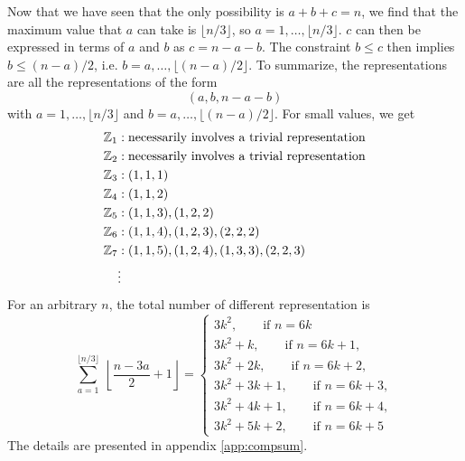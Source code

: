             Now that we have seen that the only possibility is $a+b+c=n$, we find that the maximum value that $a$ can take is $\lfloor n/3\rfloor$, so $a=1,\dots,\lfloor n/3\rfloor$. $c$ can then be expressed in terms of $a$ and $b$ as $c=n-a-b$. The constraint $b\leq c$ then implies $b\leq (n-a)/2$, i.e. $b=a,\dots,\lfloor (n-a)/2\rfloor$. To summarize, the representations are all the representations of the form
            \begin{equation}
                (a,b,n-a-b)
            \end{equation}
            with $a=1,\dots,\lfloor n/3\rfloor$ and $b=a,\dots,\lfloor (n-a)/2\rfloor$. For small values, we get
            \begin{align*}
                \mathbb{Z}_1 &: \text{necessarily involves a trivial representation}\\
                \mathbb{Z}_2 &: \text{necessarily involves a trivial representation}\\
                \mathbb{Z}_3 &: (1,1,1)\\
                \mathbb{Z}_4 &: (1,1,2)\\
                \mathbb{Z}_5 &: (1,1,3),(1,2,2)\label{reprZ5C3}\\
                \mathbb{Z}_6 &: (1,1,4),(1,2,3),(2,2,2)\\
                \mathbb{Z}_7 &: (1,1,5),(1,2,4),(1,3,3),(2,2,3)\\
                &\vdots
            \end{align*}
            For an arbitrary $n$, the total number of different representation is
            \begin{equation}
                \sum^{\lfloor n/3\rfloor}_{a=1}~\left\lfloor \frac{n-3a}{2}+1\right\rfloor = \begin{cases}
                    3k^2,\qquad\text{if $n=6k$}\\
                    3k^2+k,\qquad\text{if $n=6k+1$},\\
                    3k^2+2k,\qquad\text{if $n=6k+2$},\\
                    3k^2+3k+1,\qquad\text{if $n=6k+3$},\\
                    3k^2+4k+1,\qquad\text{if $n=6k+4$},\\
                    3k^2+5k+2,\qquad\text{if $n=6k+5$}
                \end{cases}
            \end{equation}
            The details are presented in appendix \ref{app:compsum}.

